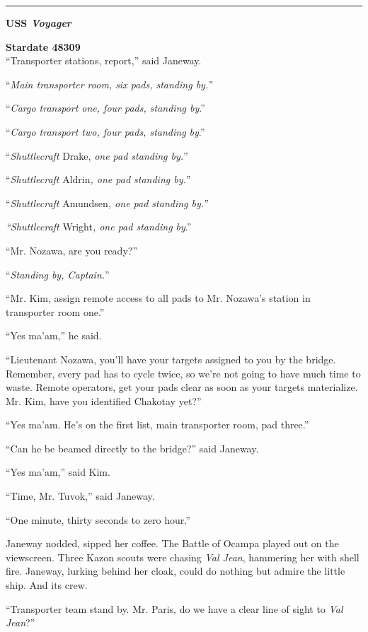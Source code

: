 \documentclass[twoside,letterpaper,12pt]{memoir}
\begin{document}
\fancybreak{\rule{3cm}{0.4 pt}} 

\noindent\textbf{USS \textit{Voyager}} 

\noindent\textbf{Stardate 48309}\\

``Transporter stations, report,'' said Janeway. 

``\textit{Main transporter room, six pads, standing by.''} 

``\textit{Cargo transport one, four pads, standing by}.'' 

``\textit{Cargo transport two, four pads, standing by}.'' 

``\textit{Shuttlecraft }Drake, \textit{one pad standing by.}'' 

``\textit{Shuttlecraft }Aldrin\textit{, one pad standing by.}'' 

``\textit{Shuttlecraft }Amundsen\textit{, one pad standing by.''} 

\textit{``Shuttlecraft }Wright\textit{, one pad standing by}.'' 

``Mr. Nozawa, are you ready?'' 

``\textit{Standing by, Captain.}'' 

``Mr. Kim, assign remote access to all pads to Mr. Nozawa's station in transporter room one.'' 

``Yes ma'am,'' he said. 

``Lieutenant Nozawa, you'll have your targets assigned to you by the bridge. Remember, every pad has to cycle twice, so we're not going to have much time to waste. Remote operators, get your pads clear as soon as your targets materialize. Mr. Kim, have you identified Chakotay yet?'' 

``Yes ma'am. He's on the first list, main transporter room, pad three.'' 

``Can he be beamed directly to the bridge?'' said Janeway. 

``Yes ma'am,'' said Kim. 

``Time, Mr. Tuvok,'' said Janeway. 

``One minute, thirty seconds to zero hour.'' 

Janeway nodded, sipped her coffee. The Battle of Ocampa played out on the viewscreen. Three Kazon scouts were chasing \textit{Val Jean}, hammering her with shell fire. Janeway, lurking behind her cloak, could do nothing but admire the little ship. And its crew. 

``Transporter team stand by. Mr. Paris, do we have a clear line of sight to \textit{Val Jean}?'' 
\end{document}

